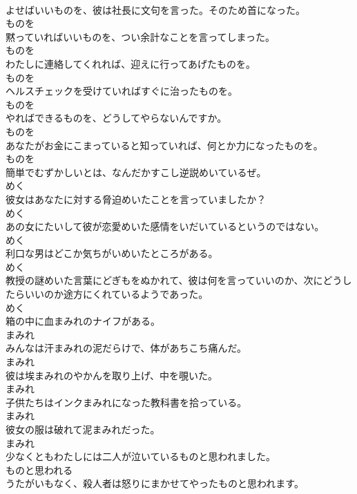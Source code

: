 \documentclass[8pt]{extreport}
\begin{document}
\begin{CJK}{UTF8}{min}
\\	よせばいいものを、彼は社長に文句を言った。そのため首になった。	
\\	ものを
\\	黙っていればいいものを、つい余計なことを言ってしまった。	
\\	ものを
\\	わたしに連絡してくれれば、迎えに行ってあげたものを。	
\\	ものを
\\	ヘルスチェックを受けていればすぐに治ったものを。	
\\	ものを
\\	やればできるものを、どうしてやらないんですか。	
\\	ものを
\\	あなたがお金にこまっていると知っていれば、何とか力になったものを。	
\\	ものを
\\	簡単でむずかしいとは、なんだかすこし逆説めいているぜ。	
\\	めく
\\	彼女はあなたに対する脅迫めいたことを言っていましたか？	
\\	めく
\\	あの女にたいして彼が恋愛めいた感情をいだいているというのではない。	
\\	めく
\\	利口な男はどこか気ちがいめいたところがある。	
\\	めく
\\	教授の謎めいた言葉にどぎもをぬかれて、彼は何を言っていいのか、次にどうしたらいいのか途方にくれているようであった。	
\\	めく
\\	箱の中に血まみれのナイフがある。	
\\	まみれ
\\	みんなは汗まみれの泥だらけで、体があちこち痛んだ。	
\\	まみれ
\\	彼は埃まみれのやかんを取り上げ、中を覗いた。	
\\	まみれ
\\	子供たちはインクまみれになった教科書を拾っている。	
\\	まみれ
\\	彼女の服は破れて泥まみれだった。	
\\	まみれ
\\	少なくともわたしには二人が泣いているものと思われました。	
\\	ものと思われる
\\	うたがいもなく、殺人者は怒りにまかせてやったものと思われます。	

\end{CJK}
\end{document}
